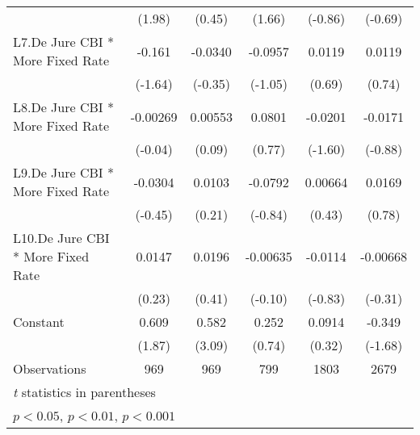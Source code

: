 {\begin{tabular*}{\linewidth}{@{\hskip\tabcolsep\extracolsep\fill}l*{5}{c}}
                &   (1.98)         &   (0.45)         &   (1.66)         &  (-0.86)         &  (-0.69)         \\
\addlinespace
L7.De Jure CBI * More Fixed Rate&   -0.161         &  -0.0340         &  -0.0957         &   0.0119         &   0.0119         \\
                &  (-1.64)         &  (-0.35)         &  (-1.05)         &   (0.69)         &   (0.74)         \\
\addlinespace
L8.De Jure CBI * More Fixed Rate& -0.00269         &  0.00553         &   0.0801         &  -0.0201         &  -0.0171         \\
                &  (-0.04)         &   (0.09)         &   (0.77)         &  (-1.60)         &  (-0.88)         \\
\addlinespace
L9.De Jure CBI * More Fixed Rate&  -0.0304         &   0.0103         &  -0.0792         &  0.00664         &   0.0169         \\
                &  (-0.45)         &   (0.21)         &  (-0.84)         &   (0.43)         &   (0.78)         \\
\addlinespace
L10.De Jure CBI * More Fixed Rate&   0.0147         &   0.0196         & -0.00635         &  -0.0114         & -0.00668         \\
                &   (0.23)         &   (0.41)         &  (-0.10)         &  (-0.83)         &  (-0.31)         \\
\addlinespace
Constant        &    0.609         &    0.582\sym{**} &    0.252         &   0.0914         &   -0.349         \\
                &   (1.87)         &   (3.09)         &   (0.74)         &   (0.32)         &  (-1.68)         \\
\midrule
Observations    &      969         &      969         &      799         &     1803         &     2679         \\
\bottomrule
\multicolumn{6}{l}{\footnotesize \textit{t} statistics in parentheses}\\
\multicolumn{6}{l}{\footnotesize \sym{*} \(p<0.05\), \sym{**} \(p<0.01\), \sym{***} \(p<0.001\)}\\
\end{tabular*}
}

